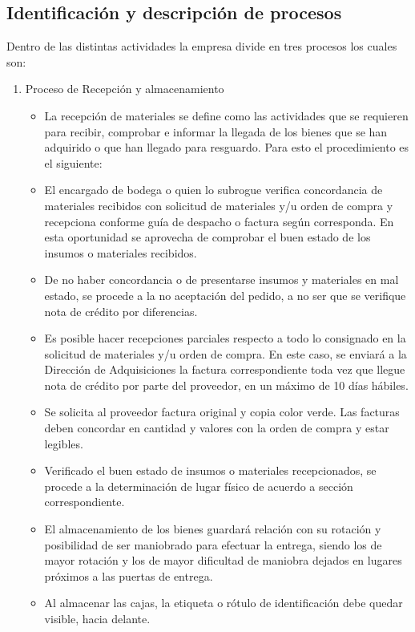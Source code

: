     
    
	\subsection{Identificación y descripción de procesos}

Dentro de las distintas actividades la empresa divide en tres procesos los cuales son:
\begin{enumerate}[1)]



\item Proceso de Recepción y almacenamiento
\begin{itemize}
\item  La recepción de materiales se define como las actividades que se requieren para recibir, comprobar e informar la llegada de los bienes que se han adquirido o que han llegado para resguardo. Para esto el procedimiento es el siguiente: 

\item El encargado de bodega o quien lo subrogue verifica concordancia de materiales recibidos con solicitud de materiales y/u orden de compra y recepciona conforme guía de despacho o factura  según corresponda. En esta oportunidad se aprovecha de comprobar el buen estado de los insumos o materiales recibidos. 
\item De no haber concordancia o de presentarse insumos y materiales en mal estado, se procede a la no aceptación del pedido, a no ser que se verifique nota de crédito por diferencias. 
\item Es posible hacer recepciones parciales respecto a todo lo consignado en la solicitud de materiales y/u orden de compra. En este caso, se enviará a la Dirección de Adquisiciones la factura correspondiente toda vez que llegue nota de crédito por parte del proveedor, en un máximo de 10 días hábiles. 
\item Se solicita al proveedor factura original y copia color verde. Las facturas deben concordar en cantidad y valores con la orden de compra y estar legibles.
\item Verificado el buen estado de insumos o materiales recepcionados, se procede a la determinación de lugar físico de acuerdo a sección correspondiente. 
\item El almacenamiento de los bienes guardará relación con su rotación y posibilidad de ser maniobrado para efectuar la entrega, siendo los de mayor rotación y los de mayor dificultad de maniobra dejados en lugares próximos a las puertas de entrega.
\item Al almacenar las cajas, la etiqueta o rótulo de identificación debe quedar visible, hacia delante.  
\end{itemize}
  

\end{enumerate}
